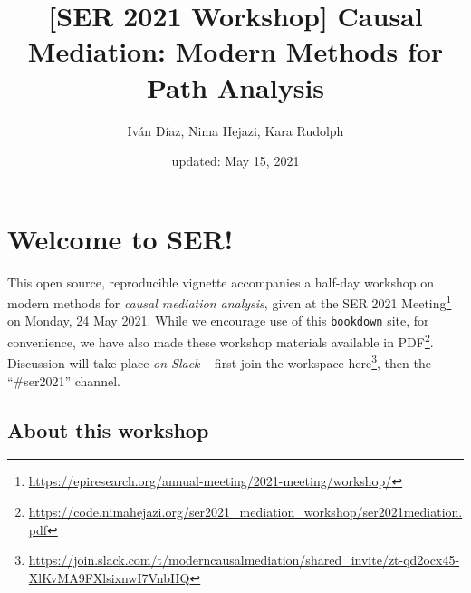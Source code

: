 \documentclass[
  12pt,
]{book}
\title{{[}SER 2021 Workshop{]} Causal Mediation: Modern Methods for Path Analysis}
\author{Iván Díaz, Nima Hejazi, Kara Rudolph}
\date{updated: May 15, 2021}
\newcommand{\passthrough}[1]{#1}
\renewcommand{\href}[2]{#2\footnote{\url{#1}}}
\theoremstyle{definition}
\theoremstyle{definition}
\theoremstyle{definition}
\newcommand{\1}{\mathbbm{1}}
\begin{document}
\maketitle


\thispagestyle{empty}

\begin{center}
\end{center}

\setlength{\abovedisplayskip}{-5pt}
\setlength{\abovedisplayshortskip}{-5pt}

\mainmatter

{
\hypersetup{linkcolor=}
\setcounter{tocdepth}{2}
\tableofcontents
}
\hypertarget{welcome-to-ser}{%
\chapter*{Welcome to SER!}\label{welcome-to-ser}}


This open source, reproducible vignette accompanies a half-day workshop on
modern methods for \emph{causal mediation analysis}, given at the \href{https://epiresearch.org/annual-meeting/2021-meeting/workshop/}{SER 2021
Meeting} on
Monday, 24 May 2021. While we encourage use of this \passthrough{\lstinline!bookdown!} site, for
convenience, we have also made these workshop materials \href{https://code.nimahejazi.org/ser2021_mediation_workshop/ser2021mediation.pdf}{available in
PDF}.
Discussion will take place \emph{on Slack} -- first join the workspace
\href{https://join.slack.com/t/moderncausalmediation/shared_invite/zt-qd2ocx45-XlKvMA9FXlsixnwI7VnbHQ}{here},
then the ``\#ser2021'' channel.

\hypertarget{about}{%
\section{About this workshop}\label{about}}
\end{document}
